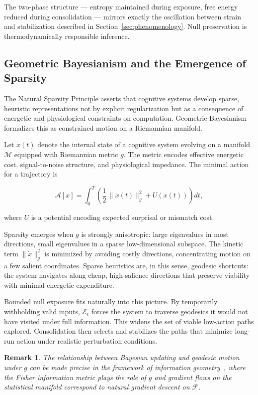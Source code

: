\documentclass[11pt]{article}
\newtheorem{remark}{Remark}
\theoremstyle{remark}
\begin{document}
The two-phase structure — entropy maintained during exposure, free energy reduced during consolidation — mirrors exactly the oscillation between strain and stabilization described in Section~\ref{sec:phenomenology}. Null preservation is thermodynamically responsible inference.

\subsection{Geometric Bayesianism and the Emergence of Sparsity}

The Natural Sparsity Principle asserts that cognitive systems develop sparse, heuristic representations not by explicit regularization but as a consequence of energetic and physiological constraints on computation. Geometric Bayesianism formalizes this as constrained motion on a Riemannian manifold.

Let $x(t)$ denote the internal state of a cognitive system evolving on a manifold $\mathcal{M}$ equipped with Riemannian metric $g$. The metric encodes effective energetic cost, signal-to-noise structure, and physiological impedance. The minimal action for a trajectory is

\begin{equation}
\mathcal{A}[x] = \int_0^T \left( \frac{1}{2}\,\|\dot{x}(t)\|_g^2 + U(x(t)) \right) dt,
\label{eq:action}
\end{equation}

where $U$ is a potential encoding expected surprisal or mismatch cost.

Sparsity emerges when $g$ is strongly anisotropic: large eigenvalues in most directions, small eigenvalues in a sparse low-dimensional subspace. The kinetic term $\|\dot{x}\|_g^2$ is minimized by avoiding costly directions, concentrating motion on a few salient coordinates. Sparse heuristics are, in this sense, geodesic shortcuts: the system navigates along cheap, high-salience directions that preserve viability with minimal energetic expenditure.

Bounded null exposure fits naturally into this picture. By temporarily withholding valid inputs, $\mathcal{E}_\epsilon$ forces the system to traverse geodesics it would not have visited under full information. This widens the set of viable low-action paths explored. Consolidation then selects and stabilizes the paths that minimize long-run action under realistic perturbation conditions.

\begin{remark}
The relationship between Bayesian updating and geodesic motion under $g$ can be made precise in the framework of information geometry~\cite{amari}, where the Fisher information metric plays the role of $g$ and gradient flows on the statistical manifold correspond to natural gradient descent on $\mathcal{F}$.
\end{remark}
\end{document}
